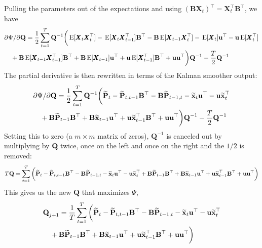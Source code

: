 \documentclass[]{article}
\def\BB{\mbox{$\mathbf B$}}	\def\bb{\mbox{$\mathbf b$}}
\def\PP{\mbox{$\mathbf P$}}  \def\pp{\mbox{$\mathbf p$}}
\def\QQ{\mbox{$\mathbf Q$}}	 \def\qq{\mbox{$\mathbf q$}}
\def\XX{\mbox{$\pmb{X}$}}	\def\xx{\mbox{$\pmb{x}$}}
\def\E{\,\textup{\textrm{E}}}
\def\hatxt{\widetilde{\mbox{$\mathbf x$}}_t}
\def\hatxtm{\widetilde{\mbox{$\mathbf x$}}_{t-1}}
\def\hatPt{\widetilde{\PP}_t}
\def\hatPtm{\widetilde{\PP}_{t-1}}
\def\hatPttm{\widetilde{\PP}_{t,t-1}}
\def\hatPtmt{\widetilde{\PP}_{t-1,t}}
\begin{document}
Pulling the parameters out of the expectations and using $(\BB\XX_t)^\top = \XX_t^\top\BB^\top$, we have
\begin{equation}\label{eq:Q.unconstrained3}
\begin{split}
&\partial\Psi/\partial\QQ = \frac{1}{2} \sum_{t=1}^T \QQ^{-1} \bigg( 
 \E[\XX_t\XX_t^\top] -\E[\XX_t\XX_{t-1}^\top ]\BB^\top - \BB\E[\XX_{t-1}\XX_t^\top ] - \E[ \XX_t ]\uu^\top - \uu \E[ \XX_t^\top ]\\
&\quad + \BB\E[ \XX_{t-1}\XX_{t-1}^\top ]\BB^\top + \BB\E[\XX_{t-1}]\uu^\top  + \uu\E[\XX_{t-1}^\top ]\BB^\top + \uu\uu^\top \bigg)\QQ^{-1} - \frac{T}{2}\QQ^{-1} 
\end{split}
\end{equation}
The partial derivative is then rewritten in terms of the Kalman smoother output:
\begin{equation}\label{eq:Q.unconstrained4}
\begin{split}
&\partial\Psi/\partial\QQ = \frac{1}{2} \sum_{t=1}^T \QQ^{-1} \bigg(  
 \hatPt - \hatPttm \BB^\top - \BB\hatPtmt 
- \hatxt\uu^\top - \uu \hatxt^\top \\
&\quad + \BB\hatPtm\BB^\top + \BB\hatxtm\uu^\top + \uu\hatxtm^\top\BB^\top + \uu\uu^\top \bigg)\QQ^{-1} - \frac{T}{2}\QQ^{-1} 
\end{split}
\end{equation}
Setting this to zero (a $m \times m$ matrix of zeros), $\QQ^{-1}$ is canceled out by multiplying by $\QQ$ twice, once on the left and once on the right and the $1/2$ is removed: 
\begin{equation}\label{eq:Q.unconstrained5}
\begin{split}
T\QQ = \sum_{t=1}^T \bigg(  
 \hatPt - \hatPttm \BB^\top - \BB\hatPtmt 
 - \hatxt\uu^\top - \uu \hatxt^\top 
 + \BB\hatPtm\BB^\top + \BB\hatxtm\uu^\top + \uu\hatxtm^\top\BB^\top 
 + \uu\uu^\top \bigg) 
\end{split}
\end{equation}
This gives us the new $\QQ$ that maximizes $\Psi$, 
\begin{equation}\label{eq:Q.update.unconstrained}
\begin{split}
&\QQ_{j+1} = \frac{1}{T}\sum_{t=1}^T \bigg( 
\hatPt - \hatPttm \BB^\top - \BB\hatPtmt 
 - \hatxt\uu^\top - \uu \hatxt^\top \\
&\quad + \BB\hatPtm\BB^\top + \BB\hatxtm\uu^\top + \uu\hatxtm^\top\BB^\top 
 + \uu\uu^\top \bigg)
\end{split}
\end{equation}
\end{document}
